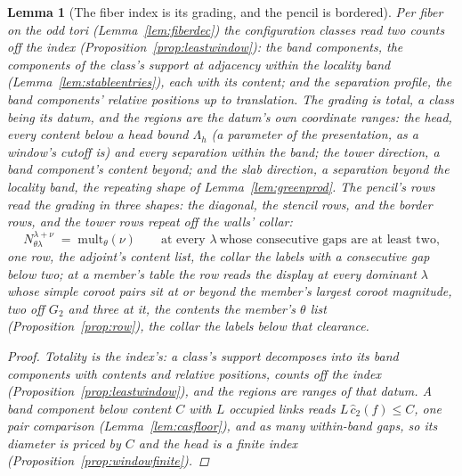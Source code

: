 \documentclass[11pt]{article}
\newtheorem{lemma}{Lemma}
\theoremstyle{definition}
\begin{document}
\begin{lemma}[The fiber index is its grading, and the pencil is
bordered]\label{lem:grading}
Per fiber on the odd tori (Lemma~\ref{lem:fiberdec}) the configuration
classes read two counts off the index
(Proposition~\ref{prop:leastwindow}): the \emph{band components}, the
components of the class's support at adjacency within the locality band
(Lemma~\ref{lem:stableentries}), each with its content; and the
\emph{separation profile}, the band components' relative positions up
to translation. The grading is total, a class being its datum, and the
regions are the datum's own coordinate ranges: the \emph{head}, every
content below a head bound $\Lambda_h$ (a parameter of the
presentation, as a window's cutoff is) and every separation within the
band; the \emph{tower} direction, a band component's content beyond;
and the \emph{slab} direction, a separation beyond the locality band, the
repeating shape of Lemma~\ref{lem:greenprod}. The pencil's rows read
the grading in three shapes: the diagonal, the stencil rows, and the
border rows, and the tower rows repeat off the walls' collar:
\[
N^{\lambda+\nu}_{\theta\lambda}\;=\;\mathrm{mult}_\theta(\nu)
\qquad\text{at every }\lambda\ \text{whose consecutive gaps are at
least two,}
\]
one row, the adjoint's content list, the collar the labels with a
consecutive gap below two; at a member's table the row reads the
display at every dominant $\lambda$ whose simple coroot pairs sit
at or beyond the member's largest coroot magnitude, two
off $G_2$ and three at it, the contents the member's $\theta$ list
(Proposition~\ref{prop:row}), the collar the labels below that
clearance.
\begin{proof}
\emph{Totality} is the index's: a class's support decomposes into its
band components with contents and relative positions, counts off the
index (Proposition~\ref{prop:leastwindow}), and the regions are ranges
of that datum. A band component below content $C$ with $L$
occupied links reads $L\,\hat c_2(f)\le C$, one pair comparison
(Lemma~\ref{lem:casfloor}), and as many within-band gaps, so its
diameter is priced by $C$ and the head is a finite index
(Proposition~\ref{prop:windowfinite}).


\end{proof}
\end{lemma}
\end{document}
